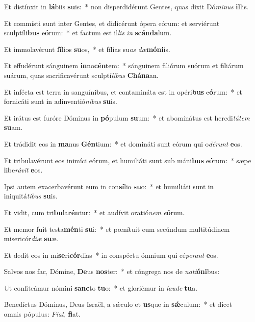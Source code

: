 \item Et distínxit in \textbf{lá}biis \textbf{su}is:~* non disperdidérunt Gentes, quas dixit Dó\textit{mi}\textit{nus} \textbf{il}lis.
\item Et commísti sunt inter Gentes, et didicérunt ópera eórum: et serviérunt sculptíli\textbf{bus} e\textbf{ó}rum:~* et factum est il\textit{lis} \textit{in} \textbf{scán}\textbf{da}lum.
\item Et immolavérunt \textbf{fí}lios \textbf{su}os,~* et fílias su\textit{as} \textit{dæ}\textbf{mó}\textbf{ni}is.
\item Et effudérunt sánguinem \textbf{in}no\textbf{cén}tem:~* sánguinem filiórum suórum et filiárum suárum, quas sacrificavérunt sculptí\textit{li}\textit{bus} \textbf{Chá}\textbf{na}an.
\item Et infécta est terra in sanguínibus, et contamináta est in opéri\textbf{bus} e\textbf{ó}rum:~* et fornicáti sunt in adinventió\textit{ni}\textit{bus} \textbf{su}is.
\item Et irátus est furóre Dóminus in \textbf{pó}pulum \textbf{su}um:~* et abominátus est heredi\textit{tá}\textit{tem} \textbf{su}am.
\item Et trádidit eos in \textbf{ma}nus \textbf{Gén}tium:~* et domináti sunt eórum qui o\textit{dé}\textit{runt} \textbf{e}os.
\item Et tribulavérunt eos inimíci eórum, et humiliáti sunt sub máni\textbf{bus} e\textbf{ó}rum:~* sæpe libe\textit{rá}\textit{vit} \textbf{e}os.
\item Ipsi autem exacerbavérunt eum in con\textbf{sí}lio \textbf{su}o:~* et humiliáti sunt in iniquitá\textit{ti}\textit{bus} \textbf{su}is.
\item Et vidit, cum tri\textbf{bu}la\textbf{rén}tur:~* et audívit oratió\textit{nem} \textit{e}\textbf{ó}rum.
\item Et memor fuit testa\textbf{mén}ti \textbf{su}i:~* et pœnítuit eum secúndum multitúdinem misericór\textit{di}\textit{æ} \textbf{su}æ.
\item Et dedit eos in mi\textbf{se}ri\textbf{cór}dias~* in conspéctu ómnium qui cé\textit{pe}\textit{rant} \textbf{e}os.
\item Salvos nos fac, Dómine, \textbf{De}us \textbf{nos}ter:~* et cóngrega nos de \textit{na}\textit{ti}\textbf{ó}\textbf{ni}bus:
\item Ut confiteámur nómini \textbf{sanc}to \textbf{tu}o:~* et gloriémur in \textit{lau}\textit{de} \textbf{tu}a.
\item Benedíctus Dóminus, Deus Israël, a sǽculo et \textbf{us}que in \textbf{sǽ}culum:~* et dicet omnis pópulus: \textit{Fi}\textit{at}, \textbf{fi}at.
